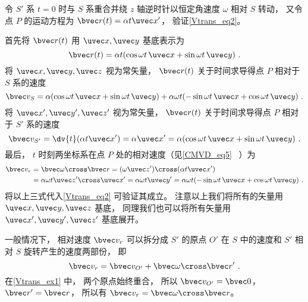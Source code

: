 \begin{example}{}\label{Vtrans_ex1}
令 $S'$ 系 $t = 0$ 时与 $S$ 系重合并绕 $z$ 轴逆时针以恒定角速度 $\omega$ 相对 $S$ 转动， 又令点 $P$ 的运动方程为 $\bvec r(t) = \alpha t \uvec x'$， 验证\autoref{Vtrans_eq2}。

首先将 $\bvec r(t)$ 用 $\uvec x, \uvec y$ 基底表示为
\begin{equation}
\bvec r(t) = \alpha t (\cos\omega t\, \uvec x + \sin\omega t\, \uvec y)~.
\end{equation}
将 $\uvec x, \uvec y, \uvec z$ 视为常矢量， $\bvec r(t)$ 关于时间求导得点 $P$ 相对于 $S$ 系的速度
\begin{equation}
\bvec v_S = \alpha (\cos\omega t \,\uvec x + \sin\omega t \,\uvec y)
+ \alpha\omega t (-\sin\omega t \,\uvec x + \cos\omega t \,\uvec y)~.
\end{equation}
将 $\uvec x', \uvec y', \uvec z'$ 视为常矢量， $\bvec r(t)$ 关于时间求导得点 $P$ 相对于 $S'$ 系的速度
\begin{equation}
\bvec v_{S'} = \dv{t} (\alpha t \uvec x') = \alpha \uvec x' = \alpha (\cos\omega t\, \uvec x + \sin\omega t \,\uvec y)~.
\end{equation}
最后， $t$ 时刻两坐标系在点 $P$ 处的相对速度（见\autoref{CMVD_eq5}~ ）为
\begin{equation}\label{Vtrans_eq3}
\begin{aligned}
\bvec v_r &= \bvec\omega \cross \bvec r = (\omega \uvec z') \cross (\alpha t \uvec x') \\
&= \alpha\omega t \uvec z'\cross\uvec x' = \alpha\omega t \uvec y' = \alpha\omega t(-\sin \omega t \,\uvec x + \cos\omega t \,\uvec y)~.
\end{aligned}\end{equation}
将以上三式代入\autoref{Vtrans_eq2} 可验证其成立。 注意以上我们将所有的矢量用 $\uvec x, \uvec y, \uvec z$ 基底， 同理我们也可以将所有矢量用 $\uvec x', \uvec y', \uvec z'$ 基底展开。
\end{example}

一般情况下， 相对速度 $\bvec v_r$ 可以拆分成 $S'$ 的原点 $O'$ 在 $S$ 中的速度和 $S'$ 相对 $S$ 旋转产生的速度两部份， 即
\begin{equation}\label{Vtrans_eq4}
\bvec v_r = \bvec v_{O'} + \bvec \omega \cross \bvec r'~.
\end{equation}
在\autoref{Vtrans_ex1} 中， 两个原点始终重合， 所以 $\bvec v_{O'} = \bvec 0$， $\bvec r' = \bvec r$， 所以有 $\bvec v_r = \bvec\omega \cross \bvec r$。

